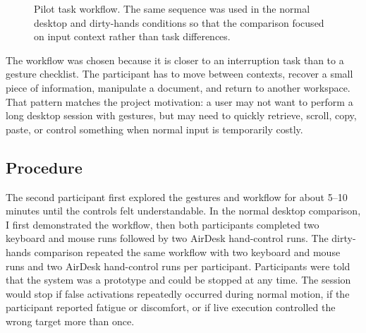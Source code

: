 \documentclass[manuscript]{acmart}
\begin{document}
\begin{figure}[h]
  \centering
  \caption{Pilot task workflow. The same sequence was used in the normal desktop and dirty-hands conditions so that the comparison focused on input context rather than task differences.}
  \label{fig:pilot-workflow}
\end{figure}

The workflow was chosen because it is closer to an interruption task than to a gesture checklist. The participant has to move between contexts, recover a small piece of information, manipulate a document, and return to another workspace. That pattern matches the project motivation: a user may not want to perform a long desktop session with gestures, but may need to quickly retrieve, scroll, copy, paste, or control something when normal input is temporarily costly.

\subsection{Procedure}

The second participant first explored the gestures and workflow for about 5--10 minutes until the controls felt understandable. In the normal desktop comparison, I first demonstrated the workflow, then both participants completed two keyboard and mouse runs followed by two AirDesk hand-control runs. The dirty-hands comparison repeated the same workflow with two keyboard and mouse runs and two AirDesk hand-control runs per participant. Participants were told that the system was a prototype and could be stopped at any time. The session would stop if false activations repeatedly occurred during normal motion, if the participant reported fatigue or discomfort, or if live execution controlled the wrong target more than once.
\end{document}
